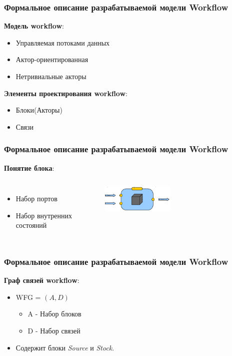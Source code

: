 \documentclass[10pt,pdf,hyperref={unicode}]{beamer}
\begin{document}
\begin{frame}
\frametitle{Формальное описание разрабатываемой модели Workflow}


\textbf{Модель workflow}:
\begin{itemize}
\item<1-> Управляемая потоками данных
\item<1-> Актор-ориентированная
\item<1-> Нетривиальные акторы
\end{itemize}

\textbf{Элементы проектирования workflow}:
\begin{itemize}
\item<1-> Блоки(Акторы)
\item<1-> Связи
\end{itemize}

\end{frame}

\begin{frame}
\frametitle{Формальное описание разрабатываемой модели Workflow}

\textbf{Понятие блока}:
 \begin{columns}
\begin{itemize}
\item<1-> Набор портов
\item<1-> Набор внутренних состояний

\end{itemize}    
\begin{figure}[here]
    \centering
    \includegraphics[width=0.5\textwidth]{block.png}
\end{figure}    
\end{columns}
\end{frame}

\begin{frame}
\frametitle{Формальное описание разрабатываемой модели Workflow}
\textbf{Граф связей workflow}:
 \begin{itemize}
 \item WFG = $(A, D)$
 \begin{itemize}
 \item A - Набор блоков
 \item D - Набор связей
 \end{itemize} 
 \item<1-> Содержит блоки \textit{Source} и \textit{Stock}.
\end{itemize} 
\end{frame}
\end{document}
